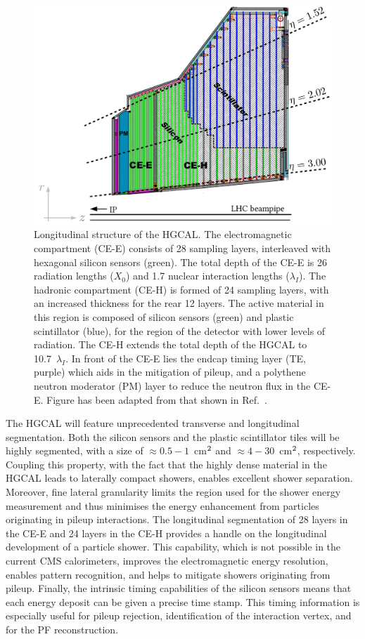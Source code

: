 \begin{figure}[htb!]
  \centering
  \includegraphics[width=1\textwidth]{Figures/cms/hgcal.pdf}
  \caption[Longitudinal structure of the High-Granularity Calorimeter]
  {
    Longitudinal structure of the HGCAL. The electromagnetic compartment (CE-E) consists of 28 sampling layers, interleaved with hexagonal silicon sensors (green). The total depth of the CE-E is 26 radiation lengths ($X_0$) and 1.7 nuclear interaction lengths ($\lambda_I$). The hadronic compartment (CE-H) is formed of 24 sampling layers, with an increased thickness for the rear 12 layers. The active material in this region is composed of silicon sensors (green) and plastic scintillator (blue), for the region of the detector with lower levels of radiation. The CE-H extends the total depth of the HGCAL to 10.7~$\lambda_I$. In front of the CE-E lies the endcap timing layer (TE, purple) which aids in the mitigation of pileup, and a polythene neutron moderator (PM) layer to reduce the neutron flux in the CE-E. Figure has been adapted from that shown in Ref.~\cite{}.
  }
  \label{fig:cms_hgcal}
\end{figure}

The HGCAL will feature unprecedented transverse and longitudinal segmentation. Both the silicon sensors and the plastic scintillator tiles will be highly segmented, with a size of $\approx0.5-1$~cm$^{\rm{2}}$ and $\approx4-30$~cm$^{\rm{2}}$, respectively. Coupling this property, with the fact that the highly dense material in the HGCAL leads to laterally compact showers, enables excellent shower separation. Moreover, fine lateral granularity limits the region used for the shower energy measurement and thus minimises the energy enhancement from particles originating in pileup interactions. The longitudinal segmentation of 28 layers in the CE-E and 24 layers in the CE-H provides a handle on the longitudinal development of a particle  shower. This capability, which is not possible in the current CMS calorimeters, improves the electromagnetic energy resolution, enables pattern recognition, and helps to mitigate showers originating from pileup. Finally, the intrinsic timing capabilities of the silicon sensors means that each energy deposit can be given a precise time stamp. This timing information is especially useful for pileup rejection, identification of the interaction vertex, and for the PF reconstruction.

